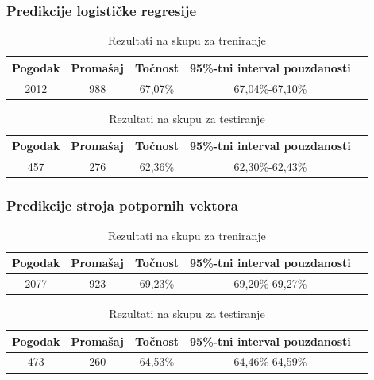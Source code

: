 \documentclass{beamer}
\begin{document}
\begin{frame}
\frametitle{Predikcije logističke regresije}

\begin{table}[h!]
\centering
\caption{Rezultati na skupu za treniranje}
\label{table:logTrain}
\begin{tabular}{@{}ccccc@{}}
\hline
Pogodak & Promašaj & Točnost  & 95\%-tni interval pouzdanosti \\
\hline
\hline
2012     & 988      & 67,07\% & 67,04\%-67,10\%  \\
\hline
\end{tabular}
\end{table}


\begin{table}[h!]
\centering
\caption{Rezultati na skupu za testiranje}
\label{table:logTest}
\begin{tabular}{@{}ccccc@{}}
\hline
Pogodak & Promašaj & Točnost  & 95\%-tni interval pouzdanosti\\
\hline
\hline
457     & 276      & 62,36\% & 62,30\%-62,43\% \\
\hline
\end{tabular}
\end{table}

\end{frame}


\begin{frame}
\frametitle{Predikcije stroja potpornih vektora}

\begin{table}[h!]
\centering
\caption{Rezultati na skupu za treniranje}
\label{table:svmTrain}
\begin{tabular}{@{}ccccc@{}}
\hline
Pogodak & Promašaj & Točnost  &  95\%-tni interval pouzdanosti\\
\hline
\hline
2077     & 923      & 69,23\% & 69,20\%-69,27\% \\
\hline
\end{tabular}
\end{table}



\begin{table}[h!]
\centering
\caption{Rezultati na skupu za testiranje}
\label{table:svmTest}
\begin{tabular}{@{}ccccc@{}}
\hline
Pogodak & Promašaj & Točnost  &  95\%-tni interval pouzdanosti\\
\hline
\hline
473     & 260      & 64,53\% & 64,46\%-64,59\% \\
\hline
\end{tabular}
\end{table}

\end{frame}
\end{document}
